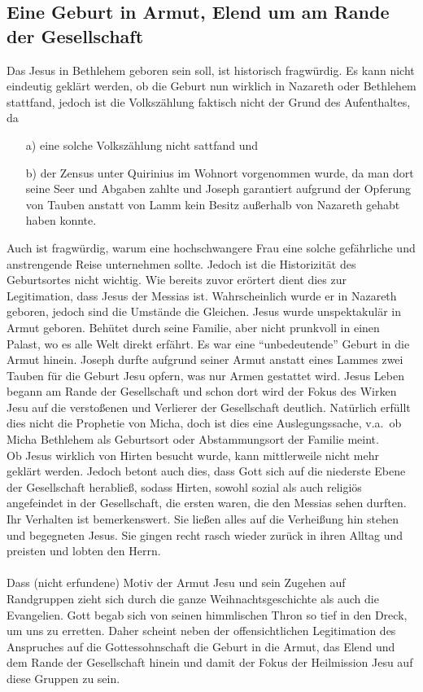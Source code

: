 \subsection{Eine Geburt in Armut, Elend um am Rande der Gesellschaft}
Das Jesus in Bethlehem geboren sein soll, ist historisch fragwürdig. Es kann nicht eindeutig geklärt werden, ob die Geburt nun wirklich in Nazareth oder Bethlehem stattfand, jedoch ist die Volkszählung faktisch nicht der Grund des Aufenthaltes, da 
\begin{itemize}
\item[a)]eine solche Volkszählung nicht sattfand und
\item[b)]der Zensus unter Quirinius im Wohnort vorgenommen wurde, da man dort seine Seer und Abgaben zahlte und Joseph garantiert aufgrund der Opferung von Tauben anstatt von Lamm kein Besitz außerhalb von Nazareth gehabt haben konnte.
\end{itemize}
Auch ist fragwürdig, warum eine hochschwangere Frau eine solche gefährliche und anstrengende Reise unternehmen sollte. Jedoch ist die Historizität des Geburtsortes nicht wichtig. Wie bereits zuvor erörtert dient dies zur Legitimation, dass Jesus der Messias ist. Wahrscheinlich wurde er in Nazareth geboren, jedoch sind die Umstände die Gleichen. Jesus wurde unspektakulär in Armut geboren. Behütet durch seine Familie, aber nicht prunkvoll in einen Palast, wo es alle Welt direkt erfährt. Es war eine ``unbedeutende'' Geburt in die Armut hinein. Joseph durfte aufgrund seiner Armut anstatt eines Lammes zwei Tauben für die Geburt Jesu opfern, was nur Armen gestattet wird. Jesus Leben begann am Rande der Gesellschaft und schon dort wird der Fokus des Wirken Jesu auf die verstoßenen und Verlierer der Gesellschaft deutlich. Natürlich erfüllt dies nicht die Prophetie von Micha, doch ist dies eine Auslegungssache, v.a.\ ob Micha Bethlehem als Geburtsort oder Abstammungsort der Familie meint.
\\
Ob Jesus wirklich von Hirten besucht wurde, kann mittlerweile nicht mehr geklärt werden. Jedoch betont auch dies, dass Gott sich auf die niederste Ebene der Gesellschaft herabließ, sodass Hirten, sowohl sozial als auch religiös angefeindet in der Gesellschaft, die ersten waren, die den Messias sehen durften. Ihr Verhalten ist bemerkenswert. Sie ließen alles auf die Verheißung hin stehen und begegneten Jesus. Sie gingen recht rasch wieder zurück in ihren Alltag und preisten und lobten den Herrn. 
\\~\\
Dass (nicht erfundene) Motiv der Armut Jesu und sein Zugehen auf Randgruppen zieht sich durch die ganze Weihnachtsgeschichte als auch die Evangelien. Gott begab sich von seinen himmlischen Thron so tief in den Dreck, um uns zu erretten. Daher scheint neben der offensichtlichen  Legitimation des Anspruches auf die Gottessohnschaft die Geburt in die Armut, das Elend und dem Rande der Gesellschaft hinein und damit der Fokus der Heilmission Jesu auf diese Gruppen zu sein.

